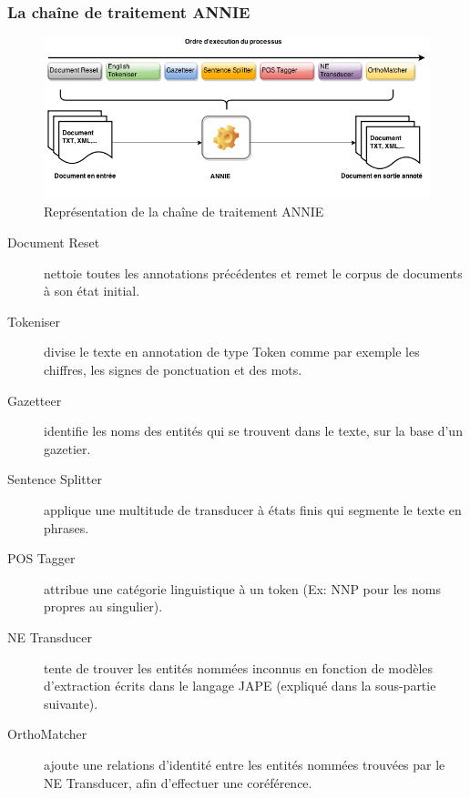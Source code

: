 \documentclass[a4paper, 11pt]{report}
\begin{document}
\subsubsection{La chaîne de traitement ANNIE}
\begin{figure}[H]
\begin{center}
\includegraphics[scale=0.5]{img/annieChaine.png} 
\end{center}
\caption{Représentation de la chaîne de traitement ANNIE}
\end{figure}
\begin{description}
\item[Document Reset] nettoie toutes les annotations précédentes et remet le
corpus de documents à son état initial.
\item[Tokeniser] divise le texte en annotation de type Token comme par exemple les chiffres, les
signes de ponctuation et des mots.
\item[Gazetteer] identifie les noms des entités qui se trouvent dans le texte, sur la base d’un gazetier.
\item[Sentence Splitter] applique une multitude de transducer à états finis qui segmente le texte en
phrases.
\item[POS Tagger] attribue une catégorie linguistique à un token (Ex: NNP pour les noms propres au singulier).
\item[NE Transducer] tente de trouver les entités nommées inconnus en fonction de modèles d'extraction écrits dans le langage JAPE (expliqué dans la sous-partie suivante).
\item[OrthoMatcher] ajoute une relations d'identité entre les entités nommées trouvées par le NE Transducer, afin d'effectuer une coréférence.
\end{description}
\end{document}

